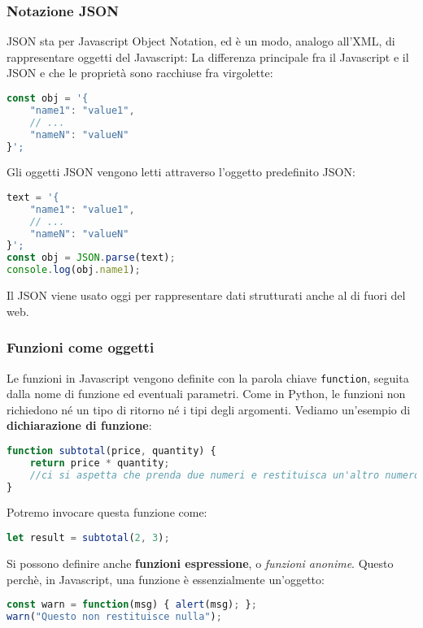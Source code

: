 \documentclass[a4paper,11pt]{article}
\begin{document}
\subsubsection{Notazione JSON}
JSON sta per Javascript Object Notation, ed è un modo, analogo all'XML, di rappresentare oggetti del Javascript:
La differenza principale fra il Javascript e il JSON e che le proprietà sono racchiuse fra virgolette:
\begin{lstlisting}[language=javascript, style=codestyle]	
const obj = '{
	"name1": "value1",
	// ...
	"nameN": "valueN"
}';
\end{lstlisting}

Gli oggetti JSON vengono letti attraverso l'oggetto predefinito JSON:
\begin{lstlisting}[language=javascript, style=codestyle]	
text = '{
	"name1": "value1",
	// ...
	"nameN": "valueN"
}';
const obj = JSON.parse(text);
console.log(obj.name1);
\end{lstlisting}

Il JSON viene usato oggi per rappresentare dati strutturati anche al di fuori del web.

\subsubsection{Funzioni come oggetti}
Le funzioni in Javascript vengono definite con la parola chiave \lstinline|function|, seguita dalla nome di funzione ed eventuali parametri.
Come in Python, le funzioni non richiedono né un tipo di ritorno né i tipi degli argomenti.
Vediamo un'esempio di \textbf{dichiarazione di funzione}:
\begin{lstlisting}[language=javascript, style=codestyle]	
function subtotal(price, quantity) {
	return price * quantity;
	//ci si aspetta che prenda due numeri e restituisca un'altro numero
}
\end{lstlisting}

Potremo invocare questa funzione come:
\begin{lstlisting}[language=javascript, style=codestyle]	
let result = subtotal(2, 3);
\end{lstlisting}

Si possono definire anche \textbf{funzioni espressione}, o  \textit{funzioni anonime}. 
Questo perchè, in Javascript, una funzione è essenzialmente un'oggetto:
\begin{lstlisting}[language=javascript, style=codestyle]	
const warn = function(msg) { alert(msg); };
warn("Questo non restituisce nulla");
\end{lstlisting}
\end{document}
